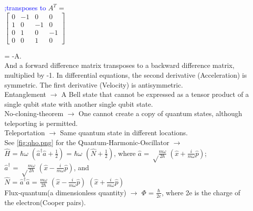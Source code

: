 \documentclass[a4paper, 10pt, onepage]{elegantbook}
\begin{document}
{\textcolor{blue}{;transposes to} $A^T$ =  \\

$
\begin{bmatrix}
0 & -1 & 0 & 0 \\
1 & 0 & -1 & 0 \\
0 & 1 & 0 & -1 \\
0 & 0 & 1 & 0
\end{bmatrix}
$

= -A.  \\

And a forward difference matrix transposes to a backward difference matrix, multiplied
by -1. In differential equations, the second derivative (Acceleration) is symmetric. The
first derivative (Velocity) is antisymmetric.  \\

 
Entanglement $\longrightarrow$ A Bell state that cannot be expressed as a tensor product of a single qubit state with another single qubit state. \\
 
No-cloning-theorem $\longrightarrow$ One cannot create a copy of quantum states, although teleporting is permitted.  \\
  
Teleportation $\longrightarrow$ Same quantum state in different locations.  \\

See \ref{fig:qho.png} for the Quantum-Harmonic-Oscillator $\longrightarrow$  \\
\noindent
$\hat H$ = $\hbar \omega$  $\left(\hat {a}^\dagger \hat {a} + \frac{1}{2} \right)$ = $\hbar \omega$ $\left(\hat N + \frac{1}{2} \right)$, where $\hat {a}$ = ${\sqrt \frac{m \omega}{2 \hbar}}$ $\left( \hat x + \frac{i}{m \omega} \hat p \right)$; \\
$\hat {a}^\dagger$ = ${\sqrt \frac{m \omega}{2 \hbar}}$ $\left( \hat x - \frac{i}{m \omega} \hat p \right)$, and  \\
$\hat N$ = $\hat {a}^\dagger \hat a$ = $\frac{m \omega}{2 \hbar}$ $\left(\hat x - \frac{i}{m \omega} \hat p \right)$ $ \left( \hat x + \frac{i}{m \omega} \hat p \right)$  \\
 
Flux-quantum(a dimensionless quantity) $\longrightarrow$ $\Phi$ = $\frac{\hbar}{2e}$, where 2e is the charge of the electron(Cooper pairs). \\
     
}
\end{document}
